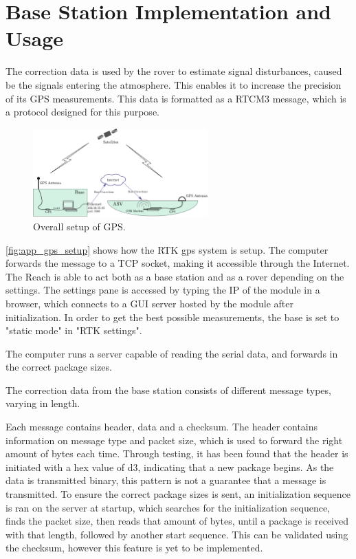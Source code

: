 \section*{Base Station Implementation and Usage}
The correction data is used by the rover to estimate signal disturbances, caused be the signals entering the atmosphere. 
This enables it to increase the precision of its GPS measurements. This data is formatted as a RTCM3 message, which is a protocol designed for this purpose.
\begin{figure}[H]
	\includegraphics[width=0.6\textwidth]{figures/comunicationSetup.pdf}
	\caption{Overall setup of GPS.}
	\label{fig:app_gps_setup}
\end{figure}
\autoref{fig:app_gps_setup} shows how the RTK gps system is setup. 
The computer forwards the message to a TCP socket, making it accessible through the Internet. 
The Reach is able to act both as a base station and as a rover depending on the settings.
The settings pane is accessed by typing the IP of the module in a browser, which connects to a GUI server hosted by the module after initialization.
In order to get the best possible measurements, the base is set to "static mode" in "RTK settings".



The computer runs a server capable of reading the serial data, and forwards in the correct package sizes.

The correction data from the base station consists of different message types, varying in length.

Each message contains header, data and a checksum. The header contains information on message type and packet size, which is used to forward the right amount of bytes each time.
Through testing, it has been found that the header is initiated with a hex value of d3, indicating that a new package begins. As the data is transmitted binary, this pattern is not a guarantee that a message is transmitted. 
To ensure the correct package sizes is sent, an initialization sequence is ran on the server at startup, which searches for the initialization sequence, finds the packet size, then reads that amount of bytes, until a package is received with that length, followed by another start sequence.
This can be validated using the checksum, however this feature is yet to be implemented. 

